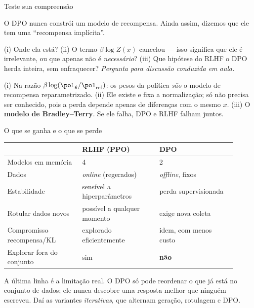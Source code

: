 \documentclass[aspectratio=169, 11pt]{beamer}
\newcommand{\paradiscussao}{\smallskip
  {\footnotesize\color{rlCinza}\itshape Pergunta para discussão conduzida em aula.}}
\newcommand{\thv}{\theta}
\newcommand{\polth}{\pol_{\thv}}                 %
\newcommand{\pref}{\pol_{\mathrm{ref}}}          %
\begin{document}
\begin{frame}{Teste sua compreensão}

  \begin{quizbox}{}
    O DPO nunca constrói um modelo de recompensa. Ainda assim, dizemos que ele
    tem uma ``recompensa implícita''.

    \smallskip
    (i) Onde ela está? (ii) O termo $\beta\log Z(x)$ cancelou --- isso significa
    que ele é irrelevante, ou que apenas não é \emph{necessário}? (iii) Que
    hipótese do RLHF o DPO herda inteira, sem enfraquecer?
    \paradiscussao
  \end{quizbox}

  \pause

  \begin{respbox}
    (i) Na razão $\beta\log(\polth/\pref)$: os pesos da política \emph{são} o
    modelo de recompensa reparametrizado. \;(ii) Ele existe e fixa a
    normalização; só não precisa ser conhecido, pois a perda depende apenas de
    diferenças com o mesmo $x$. \;(iii) O \textbf{modelo de Bradley--Terry}. Se
    ele falha, DPO e RLHF falham juntos.
  \end{respbox}
\end{frame}

\begin{frame}{O que se ganha e o que se perde}

  \begin{center}\small
  \begin{tabular}{@{}p{0.3\linewidth}p{0.31\linewidth}p{0.31\linewidth}@{}}
    \toprule
    & \textbf{RLHF (PPO)} & \textbf{DPO} \\
    \midrule
    Modelos em memória & 4 & 2 \\
    Dados & \emph{online} (regerados) & \emph{offline}, fixos \\
    Estabilidade & sensível a hiperparâmetros & perda supervisionada \\
    Rotular dados novos & possível a qualquer momento & exige nova coleta \\
    Compromisso recompensa/KL & explorado eficientemente & idem, com menos custo \\
    Explorar fora do conjunto & sim & \textbf{não} \\
    \bottomrule
  \end{tabular}
  \end{center}

  \begin{alertabox}
    A última linha é a limitação real. O DPO só pode reordenar o que já está no
    conjunto de dados; ele nunca descobre uma resposta melhor que ninguém
    escreveu. Daí as variantes \emph{iterativas}, que alternam geração,
    rotulagem e DPO.
  \end{alertabox}
\end{frame}
\end{document}
